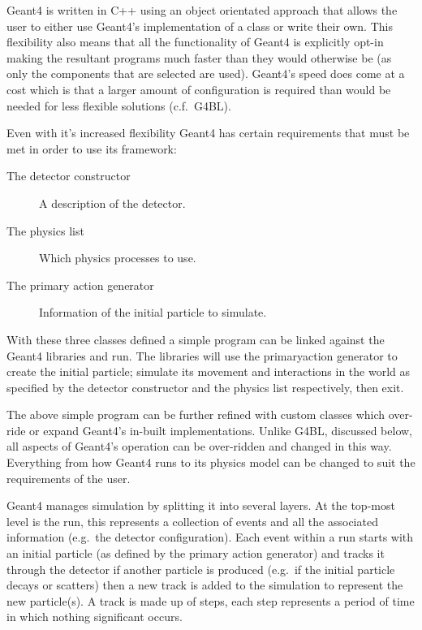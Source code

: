 Geant4 is written in C++ using an object orientated approach that allows the user to either use Geant4's implementation of a class or write their own. This flexibility also means that all the functionality of Geant4 is explicitly opt-in making the resultant programs much faster than they would otherwise be (as only the components that are selected are used). Geant4's speed does come at a cost which is that a larger amount of configuration is required than would be needed for less flexible solutions (c.f.\ G4BL).

Even with it's increased flexibility Geant4 has certain requirements that must be met in order to use its framework:
\begin{description}
  \item[The detector constructor] A description of the detector.
  \item[The physics list] Which physics processes to use.
  \item[The primary action generator] Information of the initial particle to simulate.
\end{description}
With these three classes defined a simple program can be linked against the Geant4 libraries and run. The libraries will use the primaryaction generator to create the initial particle; simulate its movement and interactions in the world as specified by the detector constructor and the physics list respectively, then exit.

The above simple program can be further refined with custom classes which over-ride or expand Geant4's in-built implementations. Unlike G4BL, discussed below, all aspects of Geant4's operation can be over-ridden and changed in this way. Everything from how Geant4 runs to its physics model can be changed to suit the requirements of the user.

Geant4 manages simulation by splitting it into several layers. At the top-most level is the run, this represents a collection of events and all the associated information (e.g.\ the detector configuration). Each event within a run starts with an initial particle (as defined by the primary action generator) and tracks it through the detector if another particle is produced (e.g.\ if the initial particle decays or scatters) then a new track is added to the simulation to represent the new particle(s). A track is made up of steps, each step represents a period of time in which nothing significant occurs.

